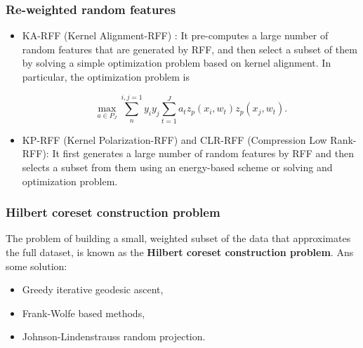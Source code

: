 \begin{frame}
  \frametitle{Re-weighted random features}

  \begin{itemize}
    \item KA-RFF (Kernel Alignment-RFF) : It pre-computes a large
    number of random features that are generated by RFF, and then
    select a subset of them by solving a simple optimization problem
    based on kernel alignment. In particular, the optimization
    problem is

    \begin{equation}
      \max_{a \in P_J}
      \sum_{n}^{i,j = 1} y_i y_j
      \sum_{t = 1}^J a_t z_p(x_i, w_t)z_p(x_j, w_t).
    \end{equation}
    \item KP-RFF (Kernel Polarization-RFF) and CLR-RFF (Compression Low Rank-RFF): It first generates a
    large number of random features by RFF and then selects a subset
    from them using an energy-based scheme or solving and optimization problem.
  \end{itemize}

  
\end{frame}

\begin{frame}
  \frametitle{Hilbert coreset construction problem}

  The problem of building a small,
weighted subset of the data that approximates the full dataset,
is known as the \textbf{Hilbert coreset construction problem}.
Ans some solution: 
\begin{itemize}
  \item Greedy iterative geodesic ascent,
  \item Frank-Wolfe based methods, 
  \item Johnson-Lindenstrauss random projection. 
\end{itemize}

\end{frame}

